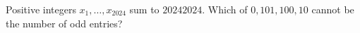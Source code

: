 Positive integers $x_1,\ldots,x_{2024}$ sum to $20242024$. Which of $0,101,100,10$ cannot be the number of odd entries?
